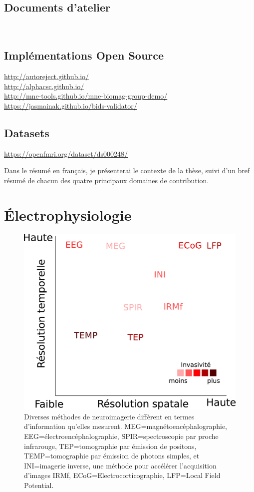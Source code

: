 \subsection*{Documents d'atelier}
\

\subsection*{Implémentations Open Source}

\url{http://autoreject.github.io/} \\
\url{http://alphacsc.github.io/} \\
\url{http://mne-tools.github.io/mne-biomag-group-demo/}\\
\url{https://jasmainak.github.io/bids-validator/}

\subsection*{Datasets}

\url{https://openfmri.org/dataset/ds000248/}

Dans le résumé en français, je présenterai le contexte de la thèse, suivi d'un bref résumé de chacun des quatre principaux domaines de contribution.

\section*{Électrophysiologie}

\begin{figure}[htb]
\begin{center}
   \includegraphics[width=0.6\linewidth]{figures/neuroimaging_methods_sommaire.pdf}
\end{center}
   \caption[]{Diverses méthodes de neuroimagerie diffèrent en termes d'information qu'elles mesurent. MEG=magnétoencéphalographie, EEG=électroencéphalographie, SPIR=spectroscopie par proche infrarouge, TEP=tomographie par émission de positons, TEMP=tomographie par émission de photons simples, et INI=imagerie inverse, une méthode pour accélérer l'acquisition d'images IRMf, ECoG=Electrocorticographie, LFP=Local Field Potential.}
   \label{fig:sommaire:neuroimaging_methods}
\end{figure}

